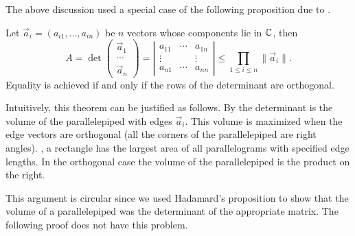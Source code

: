 \smallskip
The above discussion used a special case of the following proposition due to
{\Hadamard} \cite{Hadamard93}. 

\begin{proposition}[Hadamard] \label{Hadamard:Ineq:Prop}
Let $\vec a_{i} = (a_{i1}, \ldots, a_{in})$ be $n$ vectors whose
components lie in $\mathbb{C}$, then
\[
A = \det\left( \begin{array}{c} \vec{a}_1 \\ \cdots \\ \vec{a}_n \end{array}\right)
 = \left|
 \begin{array}{cccc}
a_{11} & \cdots & a_{1n} \\
\vdots &  & \vdots \\
a_{n1} & \cdots & a_{nn} 
\end{array}
\right| \le
\prod_{1 \le i \le n} \|\vec a_{i} \|.
\]
Equality is achieved if and only if the rows of the determinant are
orthogonal. 
\end{proposition}

Intuitively, this theorem can be justified as follows.  By
 the determinant is the volume of the
parallelepiped with edges $\vec{a}_i$.  This volume is maximized when
the edge vectors are orthogonal (all the corners of the
parallelepiped are right angles).  \Eg, a rectangle has the largest
area of all parallelograms with specified edge lengths.  In the
orthogonal case the volume of the parallelepiped is the product on
the right.  

This argument is circular since we used Hadamard's proposition to show
that the volume of a parallelepiped was the determinant of the
appropriate matrix.  The following proof does not have this problem. 


